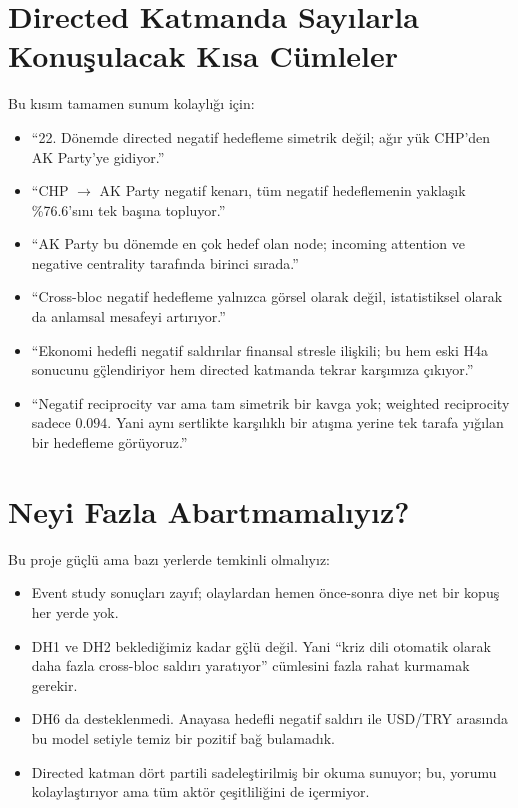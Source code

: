 \documentclass[conference]{IEEEtran}
\begin{document}
\section{Directed Katmanda Say{\i}larla Konu\c{s}ulacak K{\i}sa C\"umleler}
Bu k{\i}s{\i}m tamamen sunum kolayl{\i}\u{g}{\i} i\c{c}in:
\begin{itemize}
\item ``22. D\"onemde directed negatif hedefleme simetrik de\u{g}il; a\u{g}{\i}r y\"uk CHP'den AK Party'ye gidiyor.''
\item ``CHP $\rightarrow$ AK Party negatif kenar{\i}, t\"um negatif hedeflemenin yakla\c{s}{\i}k \%76.6's{\i}n{\i} tek ba\c{s}{\i}na topluyor.''
\item ``AK Party bu d\"onemde en \c{c}ok hedef olan node; incoming attention ve negative centrality taraf{\i}nda birinci s{\i}rada.''
\item ``Cross-bloc negatif hedefleme yaln{\i}zca g\"orsel olarak de\u{g}il, istatistiksel olarak da anlamsal mesafeyi art{\i}r{\i}yor.''
\item ``Ekonomi hedefli negatif sald{\i}r{\i}lar finansal stresle ili\c{s}kili; bu hem eski H4a sonucunu g\"\c{c}lendiriyor hem directed katmanda tekrar kar\c{s}{\i}m{\i}za \c{c}{\i}k{\i}yor.''
\item ``Negatif reciprocity var ama tam simetrik bir kavga yok; weighted reciprocity sadece $0.094$. Yani ayn{\i} sertlikte kar\c{s}{\i}l{\i}kl{\i} bir at{\i}\c{s}ma yerine tek tarafa y{\i}\u{g}{\i}lan bir hedefleme g\"or\"uyoruz.''
\end{itemize}

\section{Neyi Fazla Abartmamal{\i}y{\i}z?}
Bu proje g\"u\c{c}l\"u ama baz{\i} yerlerde temkinli olmal{\i}y{\i}z:
\begin{itemize}
\item Event study sonu\c{c}lar{\i} zay{\i}f; olaylardan hemen \"once-sonra diye net bir kopu\c{s} her yerde yok.
\item DH1 ve DH2 bekledi\u{g}imiz kadar g\"\c{c}l\"u de\u{g}il. Yani ``kriz dili otomatik olarak daha fazla cross-bloc sald{\i}r{\i} yarat{\i}yor'' c\"umlesini fazla rahat kurmamak gerekir.
\item DH6 da desteklenmedi. Anayasa hedefli negatif sald{\i}r{\i} ile USD/TRY aras{\i}nda bu model setiyle temiz bir pozitif ba\u{g} bulamad{\i}k.
\item Directed katman d\"ort partili sadele\c{s}tirilmi\c{s} bir okuma sunuyor; bu, yorumu kolayla\c{s}t{\i}r{\i}yor ama t\"um akt\"or \c{c}e\c{s}itlili\u{g}ini de i\c{c}ermiyor.
\end{itemize}
\end{document}
